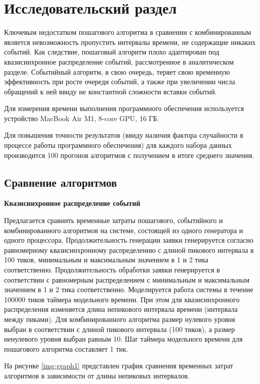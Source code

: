 \chapter{Исследовательский раздел}
Ключевым недостатком пошагового алгоритма в сравнении с комбинированным является невозможность пропустить интервалы времени, не содержащие никаких событий. Как следствие, пошаговый алгоритм плохо адаптирован под квазисинхронное распределение событий, рассмотренное в аналитическом разделе. Событийный алгоритм, в свою очередь, теряет свою временную эффективность при росте очереди событий, а также при увеличении числа обращений к ней ввиду не константной сложности вставки событий.

Для измерения времени выполнения программного обеспечения используется устройство MacBook Air M1, 8-core GPU, 16 ГБ.

Для повышения точности результатов (ввиду наличия фактора случайности в процессе работы программного обеспечения) для каждого набора данных производится 100 прогонов алгоритмов с получением в итоге среднего значения.

\section{Сравнение алгоритмов}

\textbf{Квазисинхронное распределение событий}

Предлагается сравнить временные затраты пошагового, событийного и комбинированного алгоритмов на системе, состоящей из одного генератора и одного процессора. Продолжительность генерации заявки генерируется согласно равномерному квазисинхронному распределению с длиной пикового интервала в 100 тиков, минимальным и максимальным значением в 1 и 2 тика соответственно. Продолжительность обработки заявки генерируется в соответствии с равномерным распределением с минимальным и максимальным значением в 1 и 2 тика соответственно.
Моделируется работа системы в течение 100000 тиков таймера модельного времени. При этом для квазисинхронного распределения изменяется длина непикового интервала времени (интервала между пиками). Для комбинированного алгоритма размер нулевого уровня выбран в соответствии с длиной пикового интервала (100 тиков), а размер ненулевого уровня выбран равным 10. Шаг таймера модельного времени для пошагового алгоритма составляет 1 тик.

На рисунке \ref{img:graph1} представлен график сравнения временных затрат алгоритмов в зависимости от длины непиковых интервалов.

